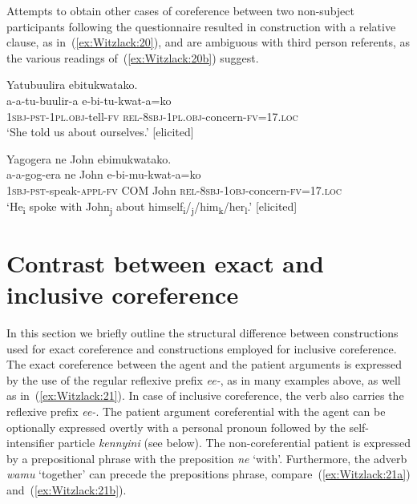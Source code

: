 \documentclass[output=paper,colorlinks,citecolor=brown,
]{langscibook}
\begin{document}
\z

Attempts to obtain other cases of coreference between two non-subject participants following the questionnaire \citep{JanicHaspelmath2020} resulted in construction with a relative clause, as in~(\ref{ex:Witzlack:20}), and are ambiguous with third person referents, as the various readings of~(\ref{ex:Witzlack:20b}) suggest.

\ea\label{ex:Witzlack:20}

\ea \label{ex:Witzlack:20a}
    \glll Yatubuulira ebitukwatako.\\
    a-a-tu-buulir-a	e-bi-tu-kwat-a=ko\\
    \textsc{1sbj}-\textsc{pst}-\textsc{1pl.obj}-tell-\textsc{fv}	\textsc{rel-8sbj}-\textsc{1pl.obj}-concern-\textsc{fv=17.loc}\\
    \glt ‘She told us about ourselves.’ [elicited]

\ex \label{ex:Witzlack:20b}
    \glll Yagogera 	ne John ebimukwatako.\\
    a-a-gog-era	ne	John e-bi-mu-kwat-a=ko\\
    \textsc{1sbj}-\textsc{pst}-speak-\textsc{appl}-\textsc{fv}	\textsc{COM} John \textsc{rel-8sbj-1obj}-concern-\textsc{fv=17.loc}\\
    \glt ‘He\textsubscript{i} spoke with John\textsubscript{j} about himself\textsubscript{i}/\textsubscript{j}/him\textsubscript{k}/her\textsubscript{l}.’ [elicited]


\z 
\z



\section{Contrast between exact and inclusive coreference}\label{sec:Witzlack:5}

In this section we briefly outline the structural difference between constructions used for exact coreference and constructions employed for inclusive coreference. 
The exact coreference between the agent and the patient arguments is expressed by the use of the regular reflexive prefix \emph{ee-}, as in many examples above, as well as in~(\ref{ex:Witzlack:21}). 
In case of inclusive coreference, the verb also carries the reflexive prefix \emph{ee-}. 
The patient argument coreferential with the agent can be optionally expressed overtly with a personal pronoun followed by the self-intensifier particle \emph{kennyini} (see below). 
The non-coreferential patient is expressed by a prepositional phrase with the preposition \emph{ne} ‘with’. 
Furthermore, the adverb \emph{wamu} ‘together’ can precede the prepositions phrase, compare~(\ref{ex:Witzlack:21a}) and~(\ref{ex:Witzlack:21b}).
\end{document}
